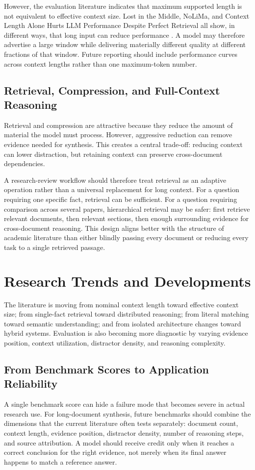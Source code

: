 \documentclass[manuscript,screen,oneside]{acmart}
\begin{document}
However, the evaluation literature indicates that maximum supported length is not equivalent to effective context size. Lost in the Middle, NoLiMa, and Context Length Alone Hurts LLM Performance Despite Perfect Retrieval all show, in different ways, that long input can reduce performance \cite{liu2024lost,modarressi2025nolima,du2025contextlength}. A model may therefore advertise a large window while delivering materially different quality at different fractions of that window. Future reporting should include performance curves across context lengths rather than one maximum-token number.

\subsection{Retrieval, Compression, and Full-Context Reasoning}\label{sec:retrieval}
Retrieval and compression are attractive because they reduce the amount of material the model must process. However, aggressive reduction can remove evidence needed for synthesis. This creates a central trade-off: reducing context can lower distraction, but retaining context can preserve cross-document dependencies.

A research-review workflow should therefore treat retrieval as an adaptive operation rather than a universal replacement for long context. For a question requiring one specific fact, retrieval can be sufficient. For a question requiring comparison across several papers, hierarchical retrieval may be safer: first retrieve relevant documents, then relevant sections, then enough surrounding evidence for cross-document reasoning. This design aligns better with the structure of academic literature than either blindly passing every document or reducing every task to a single retrieved passage.

\section{Research Trends and Developments}\label{sec:trends}
The literature is moving from nominal context length toward effective context size; from single-fact retrieval toward distributed reasoning; from literal matching toward semantic understanding; and from isolated architecture changes toward hybrid systems. Evaluation is also becoming more diagnostic by varying evidence position, context utilization, distractor density, and reasoning complexity.

\subsection{From Benchmark Scores to Application Reliability}\label{sec:application}
A single benchmark score can hide a failure mode that becomes severe in actual research use. For long-document synthesis, future benchmarks should combine the dimensions that the current literature often tests separately: document count, context length, evidence position, distractor density, number of reasoning steps, and source attribution. A model should receive credit only when it reaches a correct conclusion for the right evidence, not merely when its final answer happens to match a reference answer.
\end{document}
